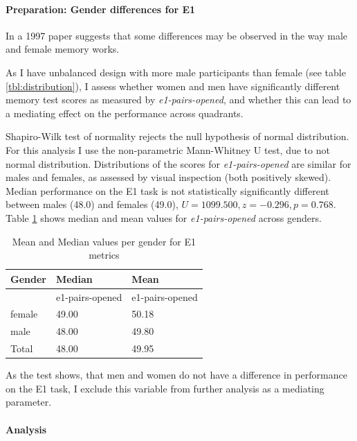 		\paragraph{Preparation: Gender differences for E1}
		
		In a 1997 paper \cite{McBurney1997} suggests that some differences may be observed in the way male and female memory works.
		
		As I have unbalanced design with more male participants than female (see table \ref{tbl:distribution}), I assess whether women and men have significantly different memory test scores as measured by \textit{e1-pairs-opened}, and whether this can lead to a mediating effect on the performance across quadrants.
		
		Shapiro-Wilk test of normality rejects the null hypothesis of normal distribution. For this analysis I use the non-parametric Mann-Whitney U test, due to not normal distribution. Distributions of the scores for \textit{e1-pairs-opened} are similar for males and females, as assessed by visual inspection (both positively skewed). Median performance on the E1 task is not statistically significantly different between males (48.0) and females (49.0), $ U = 1099.500, z = -0.296, p = 0.768 $. Table \ref{tbl:e1means} shows median and mean values for \textit{e1-pairs-opened} across genders.
		
		\begin{table}[]
			\centering
			\begin{tabular}{l|l|l}
				Gender & Median & Mean       \\ \hline
				& e1-pairs-opened  & e1-pairs-opened		\\ \hline
				female & 49.00              & 50.18                 	 \\
				male   & 48.00              & 49.80                   	 \\ \hline
				Total  & 48.00              & 49.95                  	 \\ \hline \hline
			\end{tabular}
			\caption{Mean and Median values per gender for E1 metrics}
			\label{tbl:e1means}
		\end{table}
	
		As the test shows, that men and women do not have a difference in performance on the E1 task, I exclude this variable from further analysis as a mediating parameter.
		
		\paragraph{Analysis} 
		
